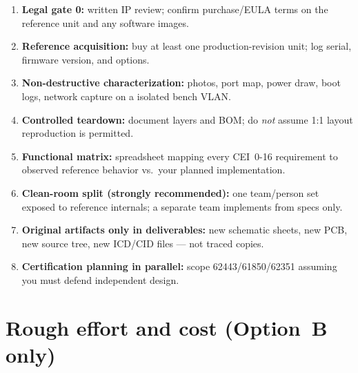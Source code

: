 \documentclass[11pt,a4paper]{article}
\begin{document}
\begin{enumerate}[leftmargin=*]
  \item \textbf{Legal gate 0:} written IP review; confirm purchase/EULA terms on the reference unit and any software images.
  \item \textbf{Reference acquisition:} buy at least one production-revision unit; log serial, firmware version, and options.
  \item \textbf{Non-destructive characterization:} photos, port map, power draw, boot logs, network capture on a isolated bench VLAN.
  \item \textbf{Controlled teardown:} document layers and BOM; do \emph{not} assume 1:1 layout reproduction is permitted.
  \item \textbf{Functional matrix:} spreadsheet mapping every CEI~0-16 requirement to observed reference behavior vs.\ your planned implementation.
  \item \textbf{Clean-room split (strongly recommended):} one team/person set exposed to reference internals; a separate team implements from specs only.
  \item \textbf{Original artifacts only in deliverables:} new schematic sheets, new PCB, new source tree, new ICD/CID files --- not traced copies.
  \item \textbf{Certification planning in parallel:} scope 62443/61850/62351 assuming you must defend independent design.
\end{enumerate}

\section{Rough effort and cost (Option~B only)}
\end{document}
